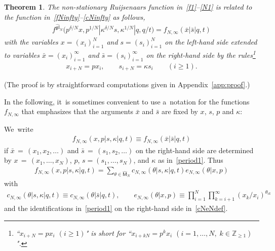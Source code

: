 \documentclass[pdftex]{sigma}%
\numberwithin{equation}{section}
\newtheorem{Theorem}{Theorem}[section]
\newcommand{\bx}{\bar{x}}
\newcommand{\bs}{\bar{s}}
\newcommand{\Z}{{\mathbb Z}}
\begin{document}
\begin{Theorem}\label{thm1}
The non-stationary Ruijsenaars function in~\eqref{f1}--\eqref{N1} is related to the function in~\eqref{fNinfty}--\eqref{cNinfty} as follows,
\begin{gather}\label{Identity1}
f^{\widehat{\mathfrak{gl}}_N}\big(p^{\delta/N}x,p^{1/N}|\kappa^{\delta/N} s,\kappa^{1/N}|q,q/t\big) = f_{N,\infty}(\bx|\bs|q,t)
\end{gather}
with the variables $x=(x_i)_{i=1}^N$ and $s=(s_i)_{i=1}^N$ on the left-hand side extended to variables $\bx=(x_i)_{i=1}^\infty$ and $\bs=(s_i)_{i=1}^\infty$ on the right-hand side by the rules\footnote{``$x_{i+N}=px_i$ $(i\geq 1)$" is short for ``$x_{i+kN}=p^kx_i$ $(i=1,\dots,N,\; k\in\Z_{\geq 1})$".}
\begin{gather}
\label{period1}
x_{i+N}=px_i,\qquad s_{i+N}=\kappa s_i \qquad (i\geq 1).
\end{gather}
\end{Theorem}
(The proof is by straightforward computations given in Appendix~\ref{app:proof}.)


In the following, it~is sometimes convenient to use a~notation for the functions $f_{N,\infty}$ that emphasizes that the arguments $\bx$ and $\bs$ are fixed by $x$, $s$, $p$ and $\kappa$:

\begin{Definition}
\label{def:fNinfty}
We~write
\begin{gather*}
f_{N,\infty}(x,p|s,\kappa|q,t) \equiv f_{N,\infty}(\bx|\bs|q,t)
\end{gather*}
if $\bx\,{=}\,(x_1,x_2,\dots)$ and $\bs\,{=}\,(s_1,s_2,\dots)$ on the right-hand side are determined by $x\,{=}\,(x_1,\dots,x_N)$, $p$, $s=(s_1,\dots,s_N)$, and $\kappa$ as in~\eqref{period1}.
Thus
\begin{gather*}
f_{N,\infty}(x,p|s,\kappa|q,t) = \sum_{\theta\in\hat{\mathsf{M}}_N} c_{N,\infty}(\theta|s,\kappa|q,t)e_{N,\infty}(\theta|x,p)
\end{gather*}
with
\begin{gather}\label{cNeNdef}
c_{N,\infty}(\theta|s,\kappa|q,t) \equiv c_{N,\infty}(\theta|\bs|q,t),
\qquad
e_{N,\infty}(\theta|x,p)\equiv \prod_{i=1}^N \prod_{k=i+1}^\infty (x_k/x_i)^{\theta_{ik}}
\end{gather}
and the identifications in~\eqref{period1} on the right-hand side in~\eqref{cNeNdef}.
\end{Definition}
\end{document}
